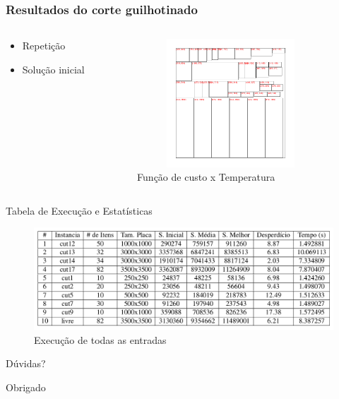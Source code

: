 \documentclass[aspectratio=169]{beamer}
\theoremstyle{Definition}
\begin{document}
\begin{frame}
	\frametitle{Resultados do corte guilhotinado}
	
		\begin{columns}
		\begin{column}{0.5\textwidth}
		   \begin{itemize}
		   		\item Repetição
				\item Solução inicial
			\end{itemize}
		\end{column}
		\begin{column}{0.5\textwidth}  %
    		\begin{figure}[h]
	   	 		\includegraphics[width=7cm, height=4.8cm]{imagens/cut}
			    \caption{Função de custo x Temperatura}
	  		\end{figure}
		\end{column}
	\end{columns}
\end{frame}

\begin{frame}[t]{Tabela de Execução e Estatísticas}
    \begin{figure}[htpb]
        \centering
        \includegraphics[width=0.8\linewidth]{imagens/table}
        \caption{Execução de todas as entradas}
        \label{fig:}
    \end{figure}
\end{frame}

\begin{frame}
Dúvidas?
\end{frame}

\begin{frame}
Obrigado
\end{frame}
\end{document}
